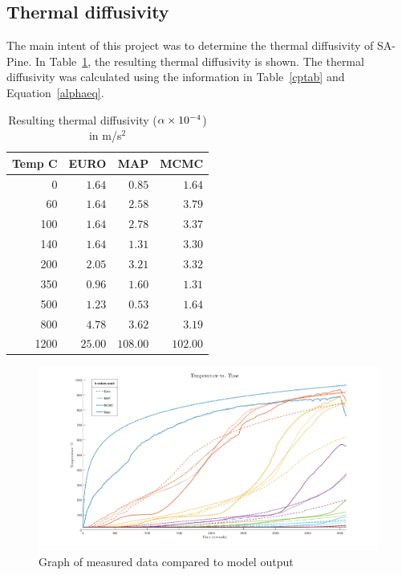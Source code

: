 \subsection{Thermal diffusivity}
The main intent of this project was to determine the thermal diffusivity of SA-Pine. 
In Table~\ref{diffrestab}, the resulting thermal diffusivity is shown.
The thermal diffusivity was calculated using the information in Table~\ref{cptab} and Equation~\ref{alphaeq}.

\begin{table}[H]
\centering
	\caption{Resulting thermal diffusivity ($\alpha \times 10^{-4}$) in m/s$^2$ }
	 \label{diffrestab}
	\begin{tabular}{ r r r r }
	\toprule
	Temp \textdegree C & EURO & MAP & MCMC\\
	\midrule
	0&   $1.64$&	$0.85$&	$1.64$\\
	60&  $1.64$&	$2.58$&	$3.79$\\
	100& $1.64$&	$2.78$&	$3.37$\\\
	140& $1.64$&	$1.31$&	$3.30$\\
	200& $2.05$&	$3.21$&	$3.32$\\
	350& $0.96$&	$1.60$&	$1.31$\\
	500& $1.23$&	$0.53$&	$1.64$\\
	800& $4.78$&	$3.62$&	$3.19$\\
	1200& $25.00$&	$108.00$&	$102.00$\\
	\bottomrule	
	\end{tabular}
	
\end{table}

\begin{figure}
	
	\centering
	\includegraphics[width=\linewidth,]{figures/finalgraph.png}
	\caption{Graph of measured data compared to model output}
	\label{final_graph}
\end{figure}





